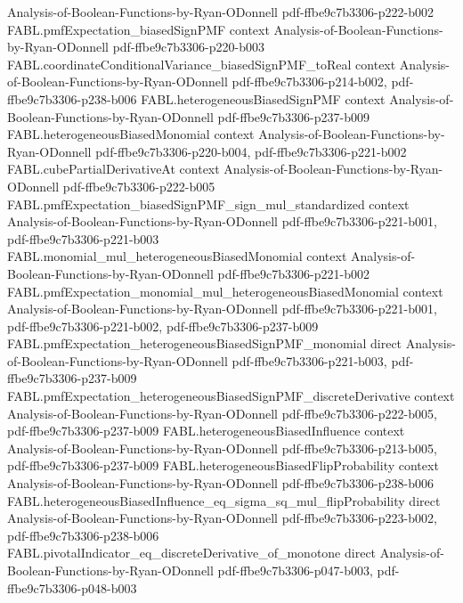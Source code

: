 \begin{theorem}
  {Analysis-of-Boolean-Functions-by-Ryan-ODonnell}
  {pdf-ffbe9c7b3306-p222-b002}
\proofstep
  {FABL.pmfExpectation_biasedSignPMF}
  {context}
  {Analysis-of-Boolean-Functions-by-Ryan-ODonnell}
  {pdf-ffbe9c7b3306-p220-b003}
\proofstep
  {FABL.coordinateConditionalVariance_biasedSignPMF_toReal}
  {context}
  {Analysis-of-Boolean-Functions-by-Ryan-ODonnell}
  {pdf-ffbe9c7b3306-p214-b002,
    pdf-ffbe9c7b3306-p238-b006}
\proofstep
  {FABL.heterogeneousBiasedSignPMF}
  {context}
  {Analysis-of-Boolean-Functions-by-Ryan-ODonnell}
  {pdf-ffbe9c7b3306-p237-b009}
\proofstep
  {FABL.heterogeneousBiasedMonomial}
  {context}
  {Analysis-of-Boolean-Functions-by-Ryan-ODonnell}
  {pdf-ffbe9c7b3306-p220-b004,
    pdf-ffbe9c7b3306-p221-b002}
\proofstep
  {FABL.cubePartialDerivativeAt}
  {context}
  {Analysis-of-Boolean-Functions-by-Ryan-ODonnell}
  {pdf-ffbe9c7b3306-p222-b005}
\proofstep
  {FABL.pmfExpectation_biasedSignPMF_sign_mul_standardized}
  {context}
  {Analysis-of-Boolean-Functions-by-Ryan-ODonnell}
  {pdf-ffbe9c7b3306-p221-b001,
    pdf-ffbe9c7b3306-p221-b003}
\proofstep
  {FABL.monomial_mul_heterogeneousBiasedMonomial}
  {context}
  {Analysis-of-Boolean-Functions-by-Ryan-ODonnell}
  {pdf-ffbe9c7b3306-p221-b002}
\proofstep
  {FABL.pmfExpectation_monomial_mul_heterogeneousBiasedMonomial}
  {context}
  {Analysis-of-Boolean-Functions-by-Ryan-ODonnell}
  {pdf-ffbe9c7b3306-p221-b001,
    pdf-ffbe9c7b3306-p221-b002,
    pdf-ffbe9c7b3306-p237-b009}
\proofstep
  {FABL.pmfExpectation_heterogeneousBiasedSignPMF_monomial}
  {direct}
  {Analysis-of-Boolean-Functions-by-Ryan-ODonnell}
  {pdf-ffbe9c7b3306-p221-b003,
    pdf-ffbe9c7b3306-p237-b009}
\proofstep
  {FABL.pmfExpectation_heterogeneousBiasedSignPMF_discreteDerivative}
  {context}
  {Analysis-of-Boolean-Functions-by-Ryan-ODonnell}
  {pdf-ffbe9c7b3306-p222-b005,
    pdf-ffbe9c7b3306-p237-b009}
\proofstep
  {FABL.heterogeneousBiasedInfluence}
  {context}
  {Analysis-of-Boolean-Functions-by-Ryan-ODonnell}
  {pdf-ffbe9c7b3306-p213-b005,
    pdf-ffbe9c7b3306-p237-b009}
\proofstep
  {FABL.heterogeneousBiasedFlipProbability}
  {context}
  {Analysis-of-Boolean-Functions-by-Ryan-ODonnell}
  {pdf-ffbe9c7b3306-p238-b006}
\proofstep
  {FABL.heterogeneousBiasedInfluence_eq_sigma_sq_mul_flipProbability}
  {direct}
  {Analysis-of-Boolean-Functions-by-Ryan-ODonnell}
  {pdf-ffbe9c7b3306-p223-b002,
    pdf-ffbe9c7b3306-p238-b006}
\proofstep
  {FABL.pivotalIndicator_eq_discreteDerivative_of_monotone}
  {direct}
  {Analysis-of-Boolean-Functions-by-Ryan-ODonnell}
  {pdf-ffbe9c7b3306-p047-b003,
    pdf-ffbe9c7b3306-p048-b003}
\proofstep

\end{theorem}
